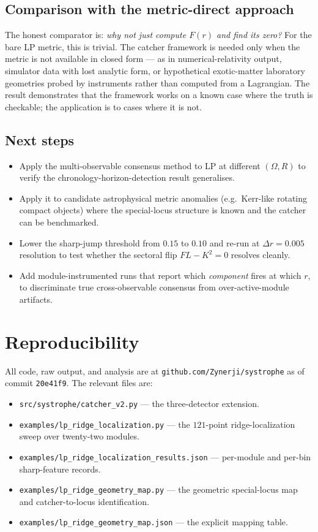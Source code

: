 \documentclass[11pt,letterpaper]{article}
\begin{document}
\subsection{Comparison with the metric-direct approach}

The honest comparator is: \emph{why not just compute $F(r)$ and find its zero?} For the bare LP metric, this is trivial. The catcher framework is needed only when the metric is not available in closed form --- as in numerical-relativity output, simulator data with lost analytic form, or hypothetical exotic-matter laboratory geometries probed by instruments rather than computed from a Lagrangian. The result demonstrates that the framework works on a known case where the truth is checkable; the application is to cases where it is not.

\subsection{Next steps}

\begin{itemize}[leftmargin=*,itemsep=0pt]
\item Apply the multi-observable consensus method to LP at different $(\Omega, R)$ to verify the chronology-horizon-detection result generalises.
\item Apply it to candidate astrophysical metric anomalies (e.g.\ Kerr-like rotating compact objects) where the special-locus structure is known and the catcher can be benchmarked.
\item Lower the sharp-jump threshold from $0.15$ to $0.10$ and re-run at $\Delta r = 0.005$ resolution to test whether the sectoral flip $FL - K^2 = 0$ resolves cleanly.
\item Add module-instrumented runs that report which \emph{component} fires at which $r$, to discriminate true cross-observable consensus from over-active-module artifacts.
\end{itemize}

\section{Reproducibility}\label{sec:repro}

All code, raw output, and analysis are at \texttt{github.com/Zynerji/systrophe} as of commit \texttt{20e41f9}. The relevant files are:

\begin{itemize}[leftmargin=*,itemsep=0pt]
\item \texttt{src/systrophe/catcher\_v2.py} --- the three-detector extension.
\item \texttt{examples/lp\_ridge\_localization.py} --- the $121$-point ridge-localization sweep over twenty-two modules.
\item \texttt{examples/lp\_ridge\_localization\_results.json} --- per-module and per-bin sharp-feature records.
\item \texttt{examples/lp\_ridge\_geometry\_map.py} --- the geometric special-locus map and catcher-to-locus identification.
\item \texttt{examples/lp\_ridge\_geometry\_map.json} --- the explicit mapping table.
\end{itemize}
\end{document}
